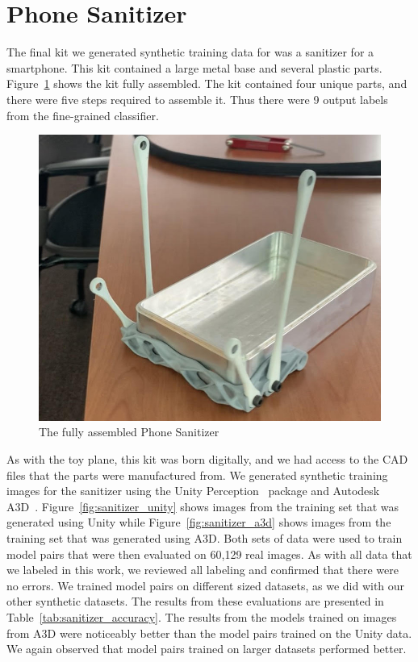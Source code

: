 \section{Phone Sanitizer}

The final kit we generated synthetic training data for was a sanitizer for a
smartphone.
This kit contained a large metal base and several plastic parts.
Figure~\ref{fig:full_sanitizer} shows the kit fully assembled.
The kit contained four unique parts, and there were five steps required to
assemble it.
Thus there were 9 output labels from the fine-grained classifier.

\begin{figure}
  \includegraphics[width=\columnwidth]{figures/synthetic/full_sanitizer.jpg}
  \caption{
    The fully assembled Phone Sanitizer
  }\label{fig:full_sanitizer}
\end{figure}

As with the toy plane, this kit was born digitally, and we had access to the
CAD files that the parts were manufactured from.
We generated synthetic training images for the sanitizer using the Unity
Perception~\cite{unity} package and Autodesk A3D~\cite{Wang_2022_CVPR}.
Figure~\ref{fig:sanitizer_unity} shows images from the training set that was
generated using Unity while Figure~\ref{fig:sanitizer_a3d}
shows images from the training set that was generated using
A3D.
Both sets of data were used to train model pairs that were then evaluated on
60,129 real images.
As with all data that we labeled in this work, we reviewed all labeling and
confirmed that there were no errors.
We trained model pairs on different sized datasets, as we did with our other
synthetic datasets.
The results from these evaluations are presented in
Table~\ref{tab:sanitizer_accuracy}.
The results from the models trained on images from A3D were noticeably better
than the model pairs trained on the Unity data.
We again observed that model pairs trained on larger datasets performed better.

